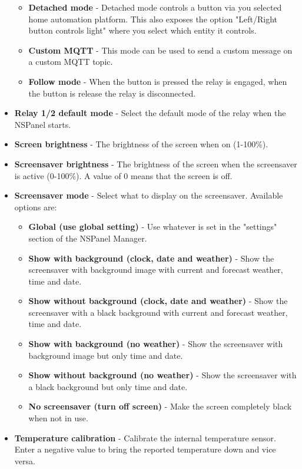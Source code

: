 \documentclass[10pt]{article}
\begin{document}
\begin{itemize}
\begin{itemize}
        \item \textbf{Detached mode} - Detached mode controls a button via you selected home automation platform. This also exposes the option "Left/Right button controls light" where you select which entity it controls.
        \item \textbf{Custom MQTT} - This mode can be used to send a custom message on a custom MQTT topic.
        \item \textbf{Follow mode} - When the button is pressed the relay is engaged, when the button is release the relay is disconnected.
      \end{itemize}
      \item \textbf{Relay 1/2 default mode} - Select the default mode of the relay when the NSPanel starts.
      \item \textbf{Screen brightness} - The brightness of the screen when on (1-100\%).
      \item \textbf{Screensaver brightness} - The brightness of the screen when the screensaver is active (0-100\%). A value of 0 means that the screen is off.
      \item \textbf{Screensaver mode} - Select what to display on the screensaver. Available options are:
      \begin{itemize}
        \item \textbf{Global (use global setting)} - Use whatever is set in the "settings" section of the NSPanel Manager.
        \item \textbf{Show with background (clock, date and weather)} - Show the screensaver with background image with current and forecast weather, time and date.
        \item \textbf{Show without background (clock, date and weather)} - Show the screensaver with a black background with current and forecast weather, time and date.
        \item \textbf{Show with background (no weather)} - Show the screensaver with background image but only time and date.
        \item \textbf{Show without background (no weather)} - Show the screensaver with a black background but only time and date.
        \item \textbf{No screensaver (turn off screen)} - Make the screen completely black when not in use.
      \end{itemize}
      \item \textbf{Temperature calibration} - Calibrate the internal temperature sensor. Enter a negative value to bring the reported temperature down and vice versa.
    \end{itemize}
    
\end{document}
